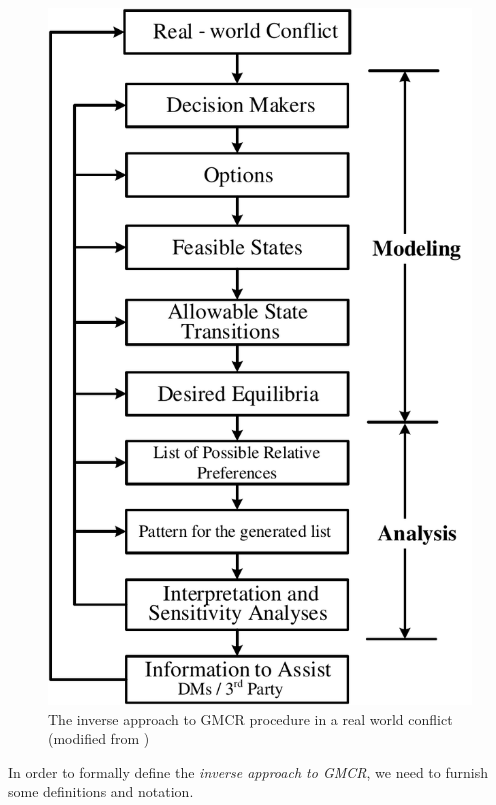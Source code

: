 \documentclass[letterpaper,12pt,titlepage,oneside,final]{book}
\begin{document}
\begin{center}
\begin{figure}[H]
\centering
\includegraphics[scale=0.55]{PDF-IMG/GMCR_inv.pdf}

\caption{The inverse approach to GMCR procedure in a real world conflict (modified from \citet{fang1993})}

\label{fig:procedure_inv}
\end{figure}
\end{center}

In order to formally define the \textit{inverse approach to GMCR}, we need to furnish some definitions and notation. 
\end{document}
